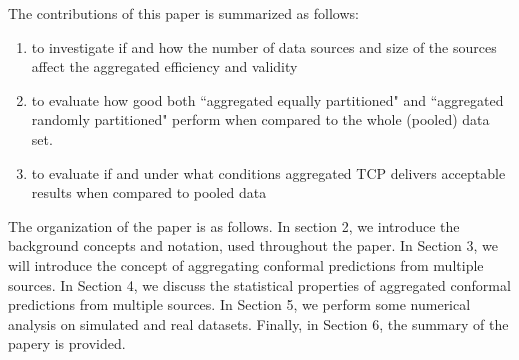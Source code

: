 \documentclass[main]{subfiles}
\newcommand{\todo}[1]{{\color{blue} #1 }}
\begin{document}

The contributions of this paper is summarized as follows:

\begin{enumerate}
\item to investigate if and how the number of data sources and size of the sources affect the aggregated efficiency and validity

\item to evaluate how good both ``aggregated equally partitioned" and ``aggregated randomly partitioned" perform when compared to the whole (pooled) data set.

\item to evaluate if and under what conditions aggregated TCP delivers acceptable results when compared to pooled data



\end{enumerate}

The organization of the paper is as follows. In section 2, we introduce the background concepts and notation, used throughout the paper. In Section 3, we will introduce the concept of aggregating conformal predictions from multiple sources. In Section 4, we discuss the statistical properties of aggregated conformal predictions from multiple sources. In Section 5, we perform some numerical analysis on simulated and real datasets. Finally, in Section 6, the summary of the papery is provided.
\end{document}
